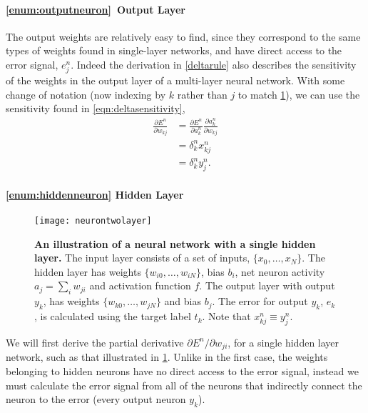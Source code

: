 \documentclass[thesis]{subfiles}
\begin{document}
\paragraph{\ref{enum:outputneuron}~Output Layer}
The output weights are relatively easy to find, since they correspond to the same types of weights found in single-layer networks, and have direct access to the error signal, \ie$e^n_j$. Indeed the derivation in \cref{deltarule} also describes the sensitivity of the weights in the output layer of a multi-layer neural network. With some change of notation (now indexing by $k$ rather than $j$ to match \cref{fig:neurontwolayer}), we can use the sensitivity found in \cref{eqn:deltasensitivity},
%
\begin{equation}
\begin{aligned}
    \frac{\partial E^n}{\partial w_{kj}} &= \frac{\partial E^n}{\partial a^n_k} \frac{\partial a^n_k}{\partial w_{kj}}\\
    &= \delta^n_k x^n_{kj}\\
    &= \delta^n_k y^n_j.
\end{aligned}
\label{eqn:outputlayer}
\end{equation}
%
\paragraph{\ref{enum:hiddenneuron} Hidden Layer}
\begin{figure}[tbp]
\centering
\texttt{[image: neurontwolayer]}
\caption[An illustration of a neural network with a single hidden layer]{\textbf{An illustration of a neural network with a single hidden layer.} The input layer consists of a set of inputs, $\{x_{0}, \ldots, x_{N}\}$. The hidden layer has weights $\{w_{i0}, \ldots, w_{iN}\}$, bias $b_i$, net neuron activity $a_j = \sum_i w_{ji}$ and activation function $f$. The output layer with output $y_k$, has weights $\{w_{k0}, \ldots, w_{jN}\}$ and bias $b_j$. The error for output $y_k$, $e_k$, is calculated using the target label $t_k$. Note that $x^n_{kj} \equiv y^n	_j$.}
\label{fig:neurontwolayer}
\end{figure}
We will first derive the partial derivative ${\partial E^n}/{\partial w_{ji}}$, for a single hidden layer network, such as that illustrated in \cref{fig:neurontwolayer}. Unlike in the first case, the weights belonging to hidden neurons have no direct access to the error signal, instead we must calculate the error signal from all of the neurons that indirectly connect the neuron to the error (\ie every output neuron $y_k$).
\end{document}
